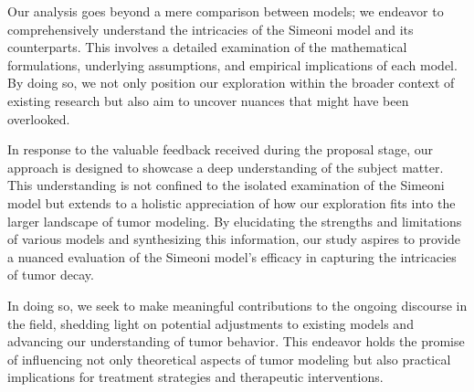 \documentclass[11pt,reqno]{amsart}
\begin{document}
Our analysis goes beyond a mere comparison between models; we endeavor to comprehensively understand the intricacies of the Simeoni model and its counterparts. This involves a detailed examination of the mathematical formulations, underlying assumptions, and empirical implications of each model. By doing so, we not only position our exploration within the broader context of existing research but also aim to uncover nuances that might have been overlooked.

In response to the valuable feedback received during the proposal stage, our approach is designed to showcase a deep understanding of the subject matter. This understanding is not confined to the isolated examination of the Simeoni model but extends to a holistic appreciation of how our exploration fits into the larger landscape of tumor modeling. By elucidating the strengths and limitations of various models and synthesizing this information, our study aspires to provide a nuanced evaluation of the Simeoni model's efficacy in capturing the intricacies of tumor decay.

In doing so, we seek to make meaningful contributions to the ongoing discourse in the field, shedding light on potential adjustments to existing models and advancing our understanding of tumor behavior. This endeavor holds the promise of influencing not only theoretical aspects of tumor modeling but also practical implications for treatment strategies and therapeutic interventions.
\end{document}
